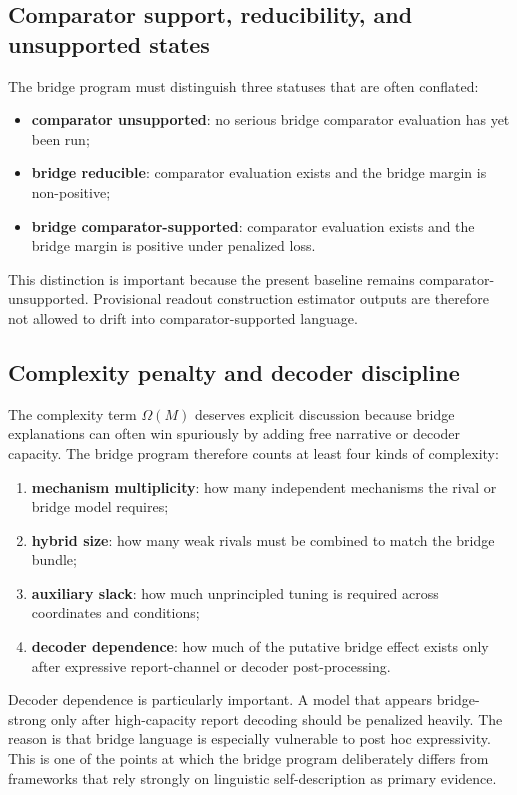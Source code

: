 \documentclass[11pt,a4paper]{article}
\theoremstyle{definition}
\begin{document}
\subsection{Comparator support, reducibility, and unsupported states}
The bridge program must distinguish three statuses that are often conflated:
\begin{itemize}[leftmargin=1.5em]
\item \textbf{comparator unsupported}: no serious bridge comparator evaluation has yet been run;
\item \textbf{bridge reducible}: comparator evaluation exists and the bridge margin is non-positive;
\item \textbf{bridge comparator-supported}: comparator evaluation exists and the bridge margin is positive under penalized loss.
\end{itemize}
This distinction is important because the present baseline remains comparator-unsupported. Provisional readout construction estimator outputs are therefore not allowed to drift into comparator-supported language.

\subsection{Complexity penalty and decoder discipline}
The complexity term $\Omega(M)$ deserves explicit discussion because bridge explanations can often win spuriously by adding free narrative or decoder capacity. The bridge program therefore counts at least four kinds of complexity:
\begin{enumerate}[leftmargin=1.5em]
\item \textbf{mechanism multiplicity}: how many independent mechanisms the rival or bridge model requires;
\item \textbf{hybrid size}: how many weak rivals must be combined to match the bridge bundle;
\item \textbf{auxiliary slack}: how much unprincipled tuning is required across coordinates and conditions;
\item \textbf{decoder dependence}: how much of the putative bridge effect exists only after expressive report-channel or decoder post-processing.
\end{enumerate}

Decoder dependence is particularly important. A model that appears bridge-strong only after high-capacity report decoding should be penalized heavily. The reason is that bridge language is especially vulnerable to post hoc expressivity. This is one of the points at which the bridge program deliberately differs from frameworks that rely strongly on linguistic self-description as primary evidence.
\end{document}
